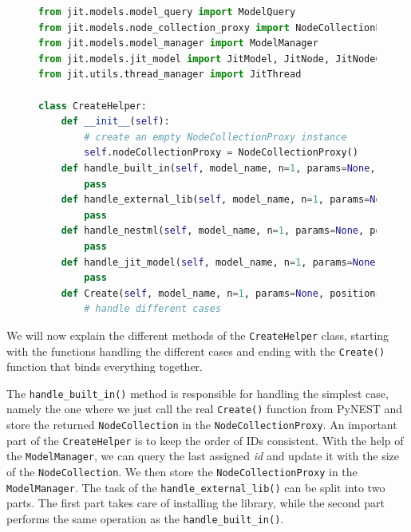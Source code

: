 \begin{figure}[ht!]
    \centering
    \begin{lstlisting}[language=Python, label=lst:create_helper, caption={The CreateHelper}]
from jit.models.model_query import ModelQuery
from jit.models.node_collection_proxy import NodeCollectionProxy
from jit.models.model_manager import ModelManager
from jit.models.jit_model import JitModel, JitNode, JitNodeCollection
from jit.utils.thread_manager import JitThread

class CreateHelper:
    def __init__(self):
        # create an empty NodeCollectionProxy instance
        self.nodeCollectionProxy = NodeCollectionProxy()
    def handle_built_in(self, model_name, n=1, params=None, positions=None):
        pass
    def handle_external_lib(self, model_name, n=1, params=None, positions=None):
        pass
    def handle_nestml(self, model_name, n=1, params=None, positions=None):
        pass
    def handle_jit_model(self, model_name, n=1, params=None, positions=None):
        pass
    def Create(self, model_name, n=1, params=None, positions=None):
        # handle different cases
\end{lstlisting}
\end{figure}

We will now explain the different methods of the \texttt{CreateHelper} class, starting with the functions handling the different cases and ending with the \texttt{Create()} function that binds everything together.

The \texttt{handle\_built\_in()} method is responsible for handling the simplest case, namely the one where we just call the real \texttt{Create()} function from PyNEST and store the returned \texttt{NodeCollection} in the \texttt{NodeCollectionProxy}. An important part of the \texttt{CreateHelper} is to keep the order of IDs consistent. With the help of the \texttt{ModelManager}, we can query the last assigned \emph{id} and update it with the size of the \texttt{NodeCollection}. We then store the \texttt{NodeCollectionProxy} in the \texttt{ModelManager}. The task of the \texttt{handle\_external\_lib()} can be split into two parts. The first part takes care of installing the library, while the  second part performs the same operation as the \texttt{handle\_built\_in()}.

